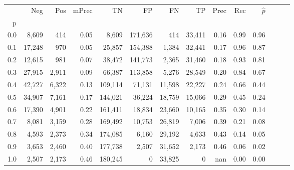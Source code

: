 \begin{tabular}{rrrrrrrrrrrrrr}
\toprule
{} &     Neg &    Pos & mPrec &       TN &       FP &      FN &      TP &  Prec &   Rec & $\hat{p}$ \\
p   &         &        &       &          &          &         &         &       &       &           \\
\midrule
0.0 &   8,609 &    414 &  0.05 &    8,609 &  171,636 &     414 &  33,411 &  0.16 &  0.99 &      0.96 \\
0.1 &  17,248 &    970 &  0.05 &   25,857 &  154,388 &   1,384 &  32,441 &  0.17 &  0.96 &      0.87 \\
0.2 &  12,615 &    981 &  0.07 &   38,472 &  141,773 &   2,365 &  31,460 &  0.18 &  0.93 &      0.81 \\
0.3 &  27,915 &  2,911 &  0.09 &   66,387 &  113,858 &   5,276 &  28,549 &  0.20 &  0.84 &      0.67 \\
0.4 &  42,727 &  6,322 &  0.13 &  109,114 &   71,131 &  11,598 &  22,227 &  0.24 &  0.66 &      0.44 \\
0.5 &  34,907 &  7,161 &  0.17 &  144,021 &   36,224 &  18,759 &  15,066 &  0.29 &  0.45 &      0.24 \\
0.6 &  17,390 &  4,901 &  0.22 &  161,411 &   18,834 &  23,660 &  10,165 &  0.35 &  0.30 &      0.14 \\
0.7 &   8,081 &  3,159 &  0.28 &  169,492 &   10,753 &  26,819 &   7,006 &  0.39 &  0.21 &      0.08 \\
0.8 &   4,593 &  2,373 &  0.34 &  174,085 &    6,160 &  29,192 &   4,633 &  0.43 &  0.14 &      0.05 \\
0.9 &   3,653 &  2,460 &  0.40 &  177,738 &    2,507 &  31,652 &   2,173 &  0.46 &  0.06 &      0.02 \\
1.0 &   2,507 &  2,173 &  0.46 &  180,245 &        0 &  33,825 &       0 &   nan &  0.00 &      0.00 \\
\bottomrule
\end{tabular}
